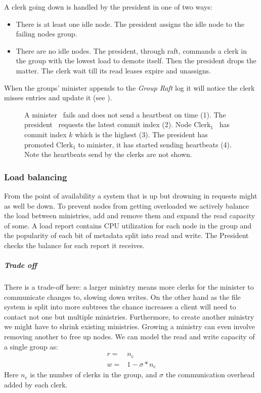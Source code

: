 A clerk going down is handled by the president in one of two ways:
\begin{itemize}
	\item There is at least one idle node. The president assigns the idle node to the failing nodes group. 
	\item There are no idle nodes. The president, through raft, commands a clerk in the group with the lowest load to demote itself. Then the president drops the matter. The clerk wait till its read leases expire and unassigns.
\end{itemize}
%
When the groups' minister appends to the \textit{Group Raft} log it will notice the clerk misses entries and update it (see ).

\begin{figure}[htbp]
	\centering
	
	\caption{A minister~\amdsLeg{} fails and does not send a heartbeat on time (1). The president~\presidentLeg{} requests the latest commit index (2). Node $\text{Clerk}_1$~\cmdsLeg{} has commit index $k$ which is the highest (3). The president has promoted $\text{Clerk}_1$ to minister, it has started sending heartbeats (4). Note the heartbeats send by the clerks are not shown.}
	\label{fig:appoint}
\end{figure}
%
\subsubsection*{Load balancing} \label{sec:loadb}
From the point of availability a system that is up but drowning in requests might as well be down. To prevent nodes from getting overloaded we actively balance the load between ministries, add and remove them and expand the read capacity of some. A load report contains CPU utilization for each node in the group and the popularity of each bit of metadata split into read and write. The President checks the balance for each report it receives.
%
\subparagraph*{Trade off} \label{sec:tradeoff}
There is a trade-off here: a larger ministry means more clerks for the minister to communicate changes to, slowing down writes. On the other hand as the file system is split into more subtrees the chance increases a client will need to contact not one but multiple ministries. Furthermore, to create another ministry we might have to shrink existing ministries. Growing a ministry can even involve removing another to free up nodes. 
%
We can model the read and write capacity of a single group as:
\begin{align}
	r =& n_\text{c} \\
	w =& 1 - \sigma*n_\text{c}
\end{align}%
Here $n_\text{c}$ is the number of clerks in the group, and $\sigma$ the communication overhead added by each clerk. 

